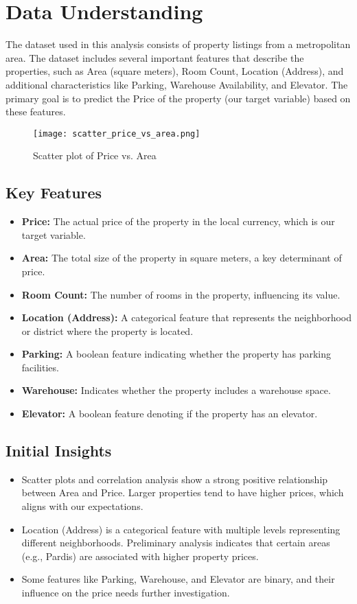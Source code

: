 \documentclass{article}
\begin{document}
\section{Data Understanding}
The dataset used in this analysis consists of property listings from a metropolitan area. The dataset includes several important features that describe the properties, such as Area (square meters), Room Count, Location (Address), and additional characteristics like Parking, Warehouse Availability, and Elevator. The primary goal is to predict the Price of the property (our target variable) based on these features.

\begin{figure}[h]
    \centering
    \texttt{[image: scatter\_price\_vs\_area.png]}
    \caption{Scatter plot of Price vs. Area}
    \label{fig:scatter_price_area}
\end{figure}

\subsection{Key Features}
\begin{itemize}
    \item \textbf{Price:} The actual price of the property in the local currency, which is our target variable.
    \item \textbf{Area:} The total size of the property in square meters, a key determinant of price.
    \item \textbf{Room Count:} The number of rooms in the property, influencing its value.
    \item \textbf{Location (Address):} A categorical feature that represents the neighborhood or district where the property is located.
    \item \textbf{Parking:} A boolean feature indicating whether the property has parking facilities.
    \item \textbf{Warehouse:} Indicates whether the property includes a warehouse space.
    \item \textbf{Elevator:} A boolean feature denoting if the property has an elevator.
\end{itemize}

\subsection{Initial Insights}
\begin{itemize}
    \item Scatter plots and correlation analysis show a strong positive relationship between Area and Price. Larger properties tend to have higher prices, which aligns with our expectations.
    \item Location (Address) is a categorical feature with multiple levels representing different neighborhoods. Preliminary analysis indicates that certain areas (e.g., Pardis) are associated with higher property prices.
    \item Some features like Parking, Warehouse, and Elevator are binary, and their influence on the price needs further investigation.
\end{itemize}
\end{document}
